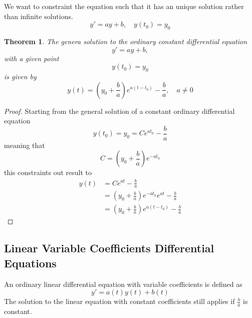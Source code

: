 \documentclass{article}
\newtheorem*{theorem2}{Theorem}
\begin{document}
We want to constraint the equation such that it has an unique solution
rather than infinite solutions.
\[
    y' = ay + b, \quad y(t_0) = y_0
\]

\begin{theorem2}
    The genera solution to the ordinary constant differential equation
    \[
        y' = ay + b,
    \]
    with a given point
    \[
        y(t_0) = y_0
    \]
    is given by
    \[
        y(t)=\left(y_0 + \frac{b}{a}\right) e^{a(t-t_0)}- \frac{b}{a},
        \quad a \neq 0
    \]
\end{theorem2}
\begin{proof}
    Starting from the general solution of a constant ordinary differential equation
    \[
        y(t_0) = y_0 = Ce^{at_0} - \frac{b}{a}
    \]
    meaning that
    \[
        C = \left(y_0 + \frac{b}{a}\right) e^{-at_0}
    \]
    this constraints out result to
    \begin{align*}
        y(t) &= Ce^{at} - \frac{b}{a} \\
             &= \left(y_0 + \frac{b}{a}\right) e^{-at_0} e^{at} - \frac{b}{a} \\
             &= \left(y_0 + \frac{b}{a}\right) e^{a(t-t_0)} - \frac{b}{a}
    \end{align*}
\end{proof}

\subsection{Linear Variable Coefficients Differential Equations}

An ordinary linear differential equation with variable coefficients is defined as
\[
    y' = a(t)y(t) + b(t)
\]
The solution to the linear equation with constant coefficients still applies
if \(\frac{b}{a}\) is constant.
\end{document}
